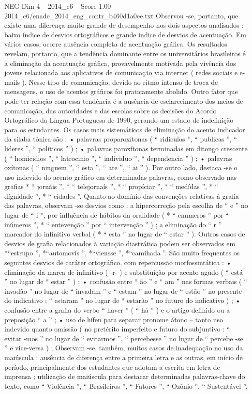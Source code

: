 \begin{textsample}{NEG Dim 4 – 2014\_c6 – Score 1.00 – 2014\_c6/enade\_2014\_eng\_contr\_b460d1a0ee.txt}
Observou -se, portanto, que existe uma diferença muito grande de desempenho nos dois aspectos analisados : baixo índice de desvios ortográficos e grande índice de desvios de acentuação.
Em vários casos, ocorre ausência completa de acentuação gráfica.
Os resultados revelam, portanto, que a tendência dominante entre os universitários brasileiros é a eliminação da acentuação gráfica, provavelmente motivada pela vivência dos jovens relacionada aos aplicativos de comunicação via internet ( redes sociais e e-mails ).
Nesse tipo de comunicação, devido ao ritmo intenso de troca de mensagens, o uso de acentos gráficos foi praticamente abolido.
Outro fator que pode ter relação com essa tendência é a ausência de esclarecimento dos meios de comunicação, das autoridades e das escolas sobre as decisões do Acordo Ortográfico da Língua Portuguesa de 1990, gerando um estado de indefinição para os estudantes.
Os casos mais sistemáticos de eliminação do acento indicador da sílaba tônica são : • palavras proparoxítonas ( “ ridiculos ”, “ publicas ”, “ lideres ”, “ politicos ” ) ; • palavras paroxítonas terminadas em ditongo crescente ( “ homicidios ”, “ latrocinio ”, “ individuo ”, “ dependencia ” ) ; • palavras oxítonas ( “ ninguem ”, “ esta ”, “ ate ”, “ ai ” ).
Por outro lado, destaca -se o uso indevido do acento gráfico em determinadas palavras, como observado nas grafias * “ jornáis ”, * “ telejornaís ”, * “ propíciar ”, * “ medídas ”, * “ dígnidade ”, * “ cídades ”.
Quanto ao domínio das convenções relativas à grafia das palavras, observam -se desvios como : a hipercorreção pela escolha de “ e ” no lugar de “ i ”, por influência de hábitos da oralidade ( * “ enumeros ” por “ inúmeros ”, * “ entevenção ” por “ intervenção ” ) ; a eliminação do “ r ” marcador do infinitivo verbal ( * “ esta ” no lugar de “ estar ” ).
Outros casos de desvios de grafia relacionados à variação diastrática podem ser observados em *“estrupo ”, *“automovís ”, *“viensse ”, *“camihada ”.
São muito frequentes os seguintes desvios de caráter ortográfico, com repercussão morfossintática : • eliminação da marca de infinitivo ( -r- ) e substituição por acento agudo ( “ está ” no lugar de “ estar ” ) ; • confusão entre “ ão ” e “ am ” nas formas verbais ( “ invadão ” no lugar de “ invadam ” e “ estam ” no lugar de “ estão ” no presente do indicativo ; “ estaram ” no lugar de “ estarão ” no futuro do indicativo ) ; • confusão entre a grafia do verbo “ haver ” ( “ há ” ) e o artigo definido ou a preposição “ a ” ; • uso de hífen para separar pronome átono – tanto uso indevido quanto omissão ( no pretérito imperfeito e futuro do subjuntivo : “ evitar -mos ” no lugar de “ evitarmos ”, “ percebesse ” no lugar de “ percebe -se ” e vice-versa ) ; Observam -se, também, muitos casos de inadequação no uso da maiúscula : ausência de diferença entre a primeira letra e as outras, em início de período, principalmente dos estudantes que adotam a escrita em letra de imprensa ; utilização de maiúscula para destacar determinadas palavras-chave do texto, como “ Violência ”, “ Brasileiros ”, “ Fatores ”, “ Ozônio ”, “ Sustentável ”.

\end{textsample}
